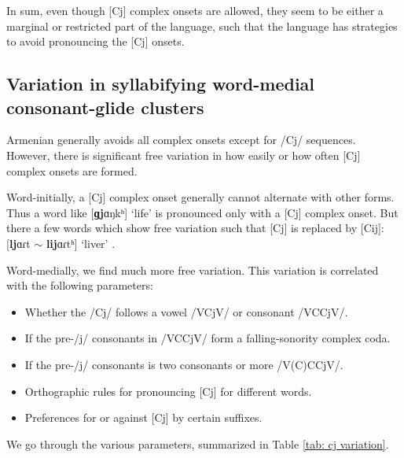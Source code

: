 	
	
	
	In sum, even though [Cj] complex onsets are allowed, they seem to be either a marginal  or restricted part of the language, such that the language has strategies to avoid pronouncing the [Cj] onsets. 
	
	\subsection{Variation in syllabifying word-medial consonant-glide clusters}\label{section:syllable:ComplexOnset:medialGlide}
	
	Armenian generally avoids all complex onsets except for /Cj/ sequences. However, there is significant free variation in how easily or how often [Cj] complex onsets are formed. 
	
	Word-initially, a [Cj] complex onset generally cannot alternate with other forms. Thus a word like [\textbf{ɡj}ɑŋkʰ] `life'  is pronounced only with a [Cj] complex onset. But there a few words which show free variation such that [Cj] is replaced by [Cij]: [\textbf{lj}ɑɾt $\sim$ \textbf{lij}ɑɾtʰ] `liver' . 
	
	Word-medially, we find much more free variation. This variation is correlated with the following parameters:
	\begin{itemize}[noitemsep, topsep = 0pt]
		\item Whether the /Cj/ follows a vowel /VCjV/ or consonant /VCCjV/. 
		\item If the pre-/j/ consonants in /VCCjV/   form a falling-sonority complex coda. 
		\item If the pre-/j/ consonants is two consonants or more /V(C)CCjV/. 
		\item Orthographic rules for pronouncing [Cj] for different words. 
		\item Preferences for or against [Cj] by certain suffixes. 
	\end{itemize}
	
	We go through the various parameters, summarized in Table \ref{tab: cj variation}.
	
